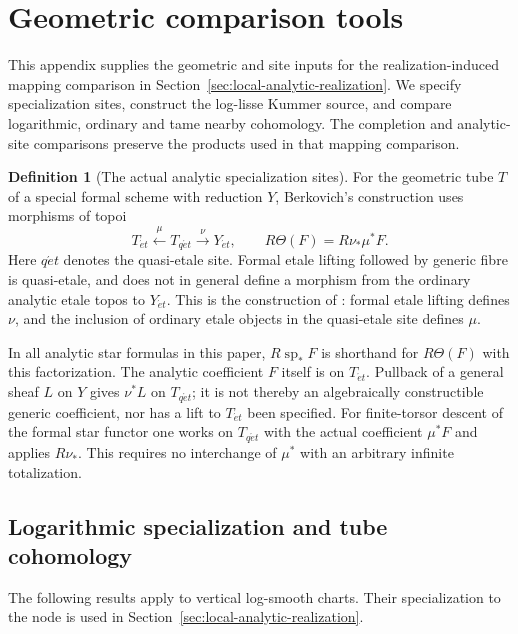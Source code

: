 \documentclass[11pt]{article}
\theoremstyle{definition}
\newtheorem{definition}[theorem]{Definition}
\theoremstyle{remark}
\begin{document}
\section{Geometric comparison tools}
\label{sec:frag-analytic-nearby}

This appendix supplies the geometric and site inputs for the
realization-induced mapping comparison in
Section~\ref{sec:local-analytic-realization}.  We specify specialization
sites, construct the log-lisse Kummer source, and compare logarithmic,
ordinary and tame nearby cohomology.  The completion and analytic-site
comparisons preserve the products used in that mapping comparison.

\begin{definition}[The actual analytic specialization sites]
\label{def:frag-analytic-specialization-sites}
For the geometric tube $T$ of a special formal scheme with reduction $Y$,
Berkovich's construction uses morphisms of topoi
\[
 T_{\acute et}\xleftarrow{\ \mu\ }T_{q\acute et}
                  \xrightarrow{\ \nu\ }Y_{\acute et},\qquad
 R\Theta(F)=R\nu_*\mu^*F.
\]
Here $q\acute et$ denotes the quasi-etale site.  Formal etale lifting
followed by generic fibre is quasi-etale, and does not in general define
a morphism from the ordinary analytic etale topos to $Y_{\acute et}$.
This is the construction of \cite[\S2, Proposition 2.1 and the
definition of $\Theta_K$ following it]{BerkovichFormalII}: formal
etale lifting defines $\nu$, and the inclusion of ordinary etale
objects in the quasi-etale site defines $\mu$.

In all analytic star formulas in this paper, $R\operatorname{sp}_*F$
is shorthand for $R\Theta(F)$ with this factorization.  The analytic
coefficient $F$ itself is on $T_{\acute et}$.  Pullback of a general
sheaf $L$ on $Y$ gives $\nu^*L$ on $T_{q\acute et}$; it is not thereby
an algebraically constructible generic coefficient, nor has a lift to
$T_{\acute et}$ been specified.  For finite-torsor descent of the formal
star functor one works on $T_{q\acute et}$ with the actual coefficient
$\mu^*F$ and applies $R\nu_*$.  This requires no interchange of $\mu^*$
with an arbitrary infinite totalization.
\end{definition}

\subsection{Logarithmic specialization and tube cohomology}

The following results apply to vertical log-smooth charts.  Their
specialization to the node is used in
Section~\ref{sec:local-analytic-realization}.
\end{document}
